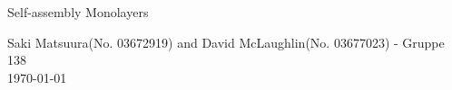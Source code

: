 \documentclass[11pt, a4paper]{article}
\begin{document}
\begin{center}

        {\huge Self-assembly Monolayers}
    \vspace{0.1cm}


      	{Saki Matsuura(No. 03672919) and David McLaughlin(No. 03677023) - Gruppe 138} \\

      	{\today}
    \vspace{-0.2cm}

\end{center}



%

\end{document}
